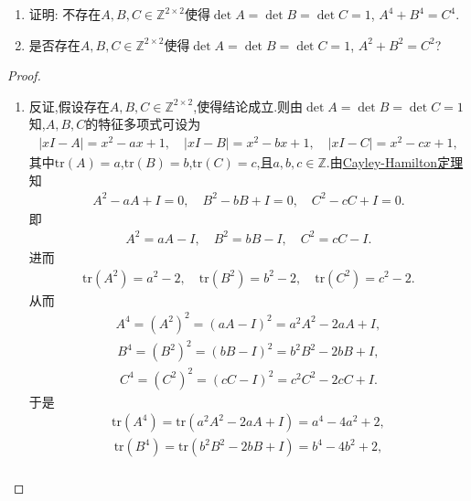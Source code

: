 \documentclass[../../main.tex]{subfiles}
\begin{document}
\begin{example}
\begin{enumerate}[(1)]
\item 证明: 不存在$A,B,C \in \mathbb{Z}^{2 \times 2}$使得$\det A = \det B = \det C = 1$, $A^4 + B^4 = C^4$.

\item 是否存在$A,B,C \in \mathbb{Z}^{2 \times 2}$使得$\det A = \det B = \det C = 1$, $A^2 + B^2 = C^2$?
\end{enumerate}
\end{example}
\begin{proof}
\begin{enumerate}[(1)]
\item 反证,假设存在$A,B,C\in \mathbb{Z}^{2 \times 2}$,使得结论成立.则由$\det A = \det B = \det C = 1$知,$A,B,C$的特征多项式可设为
\begin{align*}
|xI - A| = x^2 - ax + 1, \quad |xI - B| = x^2 - bx + 1, \quad |xI - C| = x^2 - cx + 1,
\end{align*}
其中$\mathrm{tr}(A) = a$,$\mathrm{tr}(B) = b$,$\mathrm{tr}(C) = c$,且$a,b,c\in \mathbb{Z}$.由\hyperref[theorem:Cayley-Hamilton定理]{Cayley-Hamilton定理}知
\begin{align*}
A^2 - aA + I = 0, \quad B^2 - bB + I = 0, \quad C^2 - cC + I = 0.
\end{align*}
即
\begin{align*}
A^2 = aA - I, \quad B^2 = bB - I, \quad C^2 = cC - I.
\end{align*}
进而
\begin{align*}
\mathrm{tr}(A^2) = a^2 - 2, \quad \mathrm{tr}(B^2) = b^2 - 2, \quad \mathrm{tr}(C^2) = c^2 - 2.
\end{align*}
从而
\begin{align*}
A^4 = (A^2)^2 = (aA - I)^2 = a^2A^2 - 2aA + I,
\end{align*}
\begin{align*}
B^4 = (B^2)^2 = (bB - I)^2 = b^2B^2 - 2bB + I,
\end{align*}
\begin{align*}
C^4 = (C^2)^2 = (cC - I)^2 = c^2C^2 - 2cC + I.
\end{align*}
于是
\begin{align*}
\mathrm{tr}(A^4) = \mathrm{tr}(a^2A^2 - 2aA + I) = a^4 - 4a^2 + 2,
\end{align*}
\begin{align*}
\mathrm{tr}(B^4) = \mathrm{tr}(b^2B^2 - 2bB + I) = b^4 - 4b^2 + 2,
\end{align*}
\begin{align*}

\end{align*}
\end{enumerate}
\end{proof}
\end{document}
